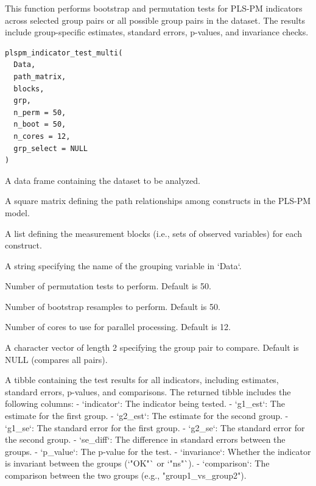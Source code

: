 \documentclass[a4paper]{book}
\begin{document}
%
\begin{Description}
This function performs bootstrap and permutation tests for PLS-PM indicators across
selected group pairs or all possible group pairs in the dataset. The results include
group-specific estimates, standard errors, p-values, and invariance checks.
\end{Description}
%
\begin{Usage}
\begin{verbatim}
plspm_indicator_test_multi(
  Data,
  path_matrix,
  blocks,
  grp,
  n_perm = 50,
  n_boot = 50,
  n_cores = 12,
  grp_select = NULL
)
\end{verbatim}
\end{Usage}
%
\begin{Arguments}
\begin{ldescription}
\item[\code{Data}] A data frame containing the dataset to be analyzed.

\item[\code{path\_matrix}] A square matrix defining the path relationships among constructs in the PLS-PM model.

\item[\code{blocks}] A list defining the measurement blocks (i.e., sets of observed variables) for each construct.

\item[\code{grp}] A string specifying the name of the grouping variable in `Data`.

\item[\code{n\_perm}] Number of permutation tests to perform. Default is 50.

\item[\code{n\_boot}] Number of bootstrap resamples to perform. Default is 50.

\item[\code{n\_cores}] Number of cores to use for parallel processing. Default is 12.

\item[\code{grp\_select}] A character vector of length 2 specifying the group pair to compare. Default is NULL (compares all pairs).
\end{ldescription}
\end{Arguments}
%
\begin{Value}
A tibble containing the test results for all indicators, including estimates, standard errors, p-values, and comparisons.
The returned tibble includes the following columns:
- `indicator`: The indicator being tested.
- `g1\_est`: The estimate for the first group.
- `g2\_est`: The estimate for the second group.
- `g1\_se`: The standard error for the first group.
- `g2\_se`: The standard error for the second group.
- `se\_diff`: The difference in standard errors between the groups.
- `p\_value`: The p-value for the test.
- `invariance`: Whether the indicator is invariant between the groups (`"OK"` or `"ns"`).
- `comparison`: The comparison between the two groups (e.g., "group1\_vs\_group2").
\end{Value}
\end{document}
